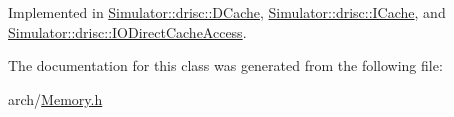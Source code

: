 Implemented in \hyperlink{class_simulator_1_1drisc_1_1_d_cache_a5f642cb471c08f5056f7bc3a93b8312d}{Simulator\+::drisc\+::\+D\+Cache}, \hyperlink{class_simulator_1_1drisc_1_1_i_cache_ad07b2819c8bdf6a286eb484647d75d98}{Simulator\+::drisc\+::\+I\+Cache}, and \hyperlink{class_simulator_1_1drisc_1_1_i_o_direct_cache_access_a472d68272a889a901d2055deb75e84f7}{Simulator\+::drisc\+::\+I\+O\+Direct\+Cache\+Access}.



The documentation for this class was generated from the following file\+:\begin{DoxyCompactItemize}
\item 
arch/\hyperlink{_memory_8h}{Memory.\+h}\end{DoxyCompactItemize}
